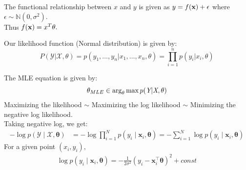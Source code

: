 \documentclass[handout]{beamer}
\begin{document}
\begin{frame}
The functional relationship between $x$ and $y$ is given as $y = f(\bold{x})+\epsilon$ where $\epsilon\sim \mathbb{N}(0, \sigma^2).$ \\ 
Thus $f(\bold{x}) = x^T\theta.$\\ 
\addlinespace
{}

\end{frame}


\begin{frame}
Our likelihood function (Normal distribution) is given by:
\begin{equation}
P(\mathcal{Y}|\mathcal{X},\theta) = p(y_1,\ldots,y_n|x_1,\ldots,x_n,\theta) = \prod_{i=1}^n p(y_i|x_i, \theta) 
\end{equation}

The MLE equation is given by:
\begin{equation}
    \theta_{MLE}\in \arg_{\theta} \max p(\emph{Y}|\emph{X},\theta)
\end{equation}
Maximizing the likelihood $\sim$ Maximizing the log likelihood $\sim$ Minimizing the negative log likelihood.\\
Taking negative log, we get:
    \begin{align*}
        -\log p(\mathcal{Y} \mid \mathcal{X}, \boldsymbol{\theta})&=-\log \prod_{i=1}^N p\left(y_i \mid \boldsymbol{x}_i, \boldsymbol{\theta}\right)=-\sum_{i=1}^N \log p\left(y_i \mid \boldsymbol{x}_i, \boldsymbol{\theta}\right)
    \end{align*}
    For a given point $(x_i, y_i),$
    \begin{align*}
         \log p\left(y_i \mid \boldsymbol{x}_i, \boldsymbol{\theta}\right)=-\frac{1}{2 \sigma^2}\left(y_i-\boldsymbol{x}_i^{\top} \boldsymbol{\theta}\right)^2+ const
    \end{align*}
\end{frame}
\end{document}
